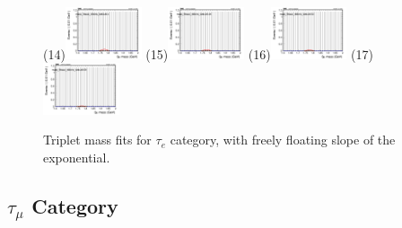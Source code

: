 \begin{figure}[h!]
        \subfigure(14){\includegraphics[width=0.2\textwidth]{unfixed_exp/plots/taue/massfit_taue_40bins_bdtcut0.4.png}}
        \subfigure(15){\includegraphics[width=0.2\textwidth]{unfixed_exp/plots/taue/massfit_taue_40bins_bdtcut0.46.png}}
        \subfigure(16){\includegraphics[width=0.2\textwidth]{unfixed_exp/plots/taue/massfit_taue_40bins_bdtcut0.52.png}}
        \subfigure(17){\includegraphics[width=0.2\textwidth]{unfixed_exp/plots/taue/massfit_taue_40bins_bdtcut0.58.png}}
        \caption{Triplet mass fits for $\tau_{e}$ category, with freely floating slope of the exponential.}
        \label{fig:unfixed_taue}
\end{figure}

\newpage

\subsection{$\tau_{\mu}$ Category}
\label{sec:taumu}

